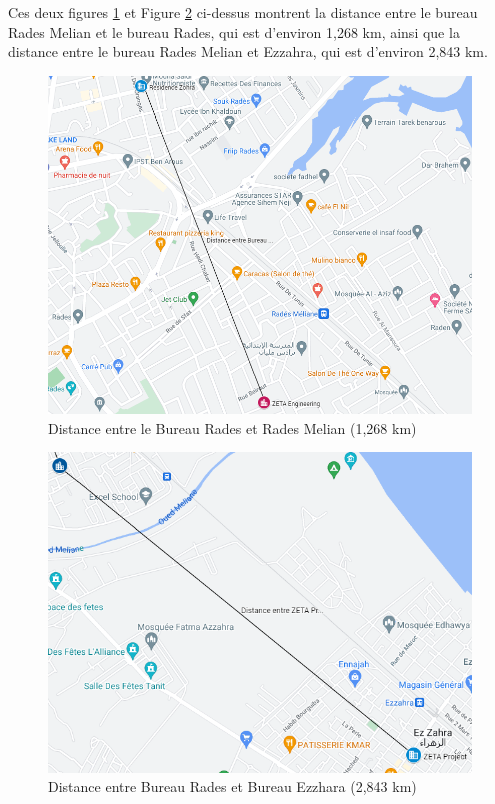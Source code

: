 Ces deux figures \ref{Chap2.4.21} et Figure \ref{Chap2.5.5} ci-dessus montrent la distance entre le bureau Rades Melian et le bureau Rades, qui est d'environ 1,268 km, ainsi que la distance entre le bureau Rades Melian et Ezzahra, qui est d'environ 2,843 km. \\

\begin{figure}[H]
\centering
\includegraphics[width=16cm]{Images/distance1.png}
\caption{Distance entre le Bureau Rades et Rades Melian (1,268 km)}
\label{Chap2.4.21}
\end{figure}


\begin{figure}[H]
 \centering
    \includegraphics[width=16cm]{Images/Distance2.png}
    \caption{Distance entre Bureau Rades et Bureau Ezzhara (2,843 km)}
    \label{Chap2.5.5}
\end{figure}    

